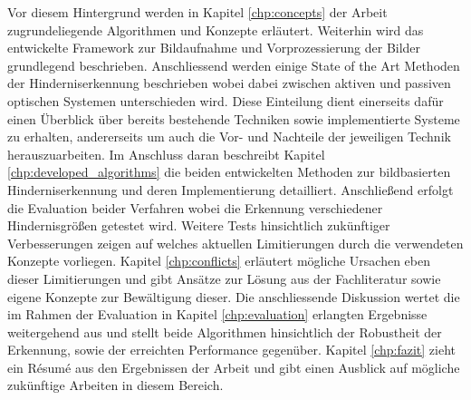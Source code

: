\noindent
Vor diesem Hintergrund werden in Kapitel \ref{chp:concepts} der Arbeit zugrundeliegende Algorithmen und Konzepte erläutert. Weiterhin wird das entwickelte Framework zur Bildaufnahme und Vorprozessierung der Bilder grundlegend beschrieben. Anschliessend werden einige State of the Art Methoden der Hinderniserkennung beschrieben wobei dabei zwischen aktiven und passiven optischen Systemen unterschieden wird. Diese Einteilung dient einerseits dafür einen Überblick über bereits bestehende Techniken sowie implementierte Systeme zu erhalten, andererseits um auch die Vor- und Nachteile der jeweiligen Technik herauszuarbeiten. Im Anschluss daran beschreibt Kapitel \ref{chp:developed_algorithms} die beiden entwickelten Methoden zur bildbasierten Hinderniserkennung und deren Implementierung detailliert. Anschließend erfolgt die Evaluation beider Verfahren wobei die Erkennung verschiedener Hindernisgrößen getestet wird. Weitere Tests hinsichtlich zukünftiger Verbesserungen zeigen auf welches aktuellen Limitierungen durch die verwendeten Konzepte vorliegen. Kapitel \ref{chp:conflicts} erläutert mögliche Ursachen eben dieser Limitierungen und gibt Ansätze zur Lösung aus der Fachliteratur sowie eigene Konzepte zur Bewältigung dieser. Die anschliessende Diskussion wertet die im Rahmen der Evaluation in Kapitel \ref{chp:evaluation} erlangten Ergebnisse weitergehend aus und stellt beide Algorithmen hinsichtlich der Robustheit der Erkennung, sowie der erreichten Performance gegenüber. Kapitel \ref{chp:fazit} zieht ein Ré­su­mé aus den Ergebnissen der Arbeit und gibt einen Ausblick auf mögliche zukünftige Arbeiten in diesem Bereich.